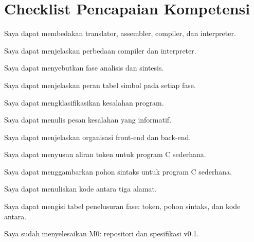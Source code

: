 \section*{Checklist Pencapaian Kompetensi}

\begin{checklist}
  \item Saya dapat membedakan translator, assembler, compiler, dan
        interpreter.
  \item Saya dapat menjelaskan perbedaan compiler dan interpreter.
  \item Saya dapat menyebutkan fase analisis dan sintesis.
  \item Saya dapat menjelaskan peran tabel simbol pada setiap fase.
  \item Saya dapat mengklasifikasikan kesalahan program.
  \item Saya dapat menulis pesan kesalahan yang informatif.
  \item Saya dapat menjelaskan organisasi front-end dan back-end.
  \item Saya dapat menyusun aliran token untuk program C sederhana.
  \item Saya dapat menggambarkan pohon sintaks untuk program C
        sederhana.
  \item Saya dapat menuliskan kode antara tiga alamat.
  \item Saya dapat mengisi tabel penelusuran fase: token, pohon
        sintaks, dan kode antara.
  \item Saya sudah menyelesaikan M0: repositori dan spesifikasi v0.1.
\end{checklist}
